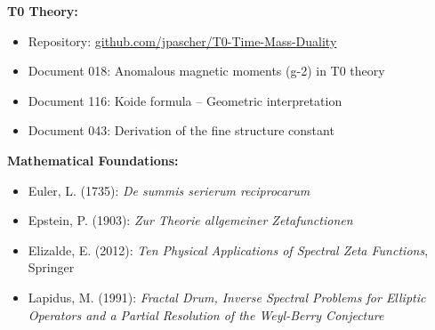 	\textbf{T0 Theory:}
	\begin{itemize}
		\item Repository: \href{https://github.com/jpascher/T0-Time-Mass-Duality}{github.com/jpascher/T0-Time-Mass-Duality}
		\item Document 018: Anomalous magnetic moments (g-2) in T0 theory
		\item Document 116: Koide formula -- Geometric interpretation
		\item Document 043: Derivation of the fine structure constant
	\end{itemize}
	
	\textbf{Mathematical Foundations:}
	\begin{itemize}
		\item Euler, L. (1735): \textit{De summis serierum reciprocarum}
		\item Epstein, P. (1903): \textit{Zur Theorie allgemeiner Zetafunctionen}
		\item Elizalde, E. (2012): \textit{Ten Physical Applications of Spectral Zeta Functions}, Springer
		\item Lapidus, M. (1991): \textit{Fractal Drum, Inverse Spectral Problems for Elliptic Operators and a Partial Resolution of the Weyl-Berry Conjecture}
	\end{itemize}

